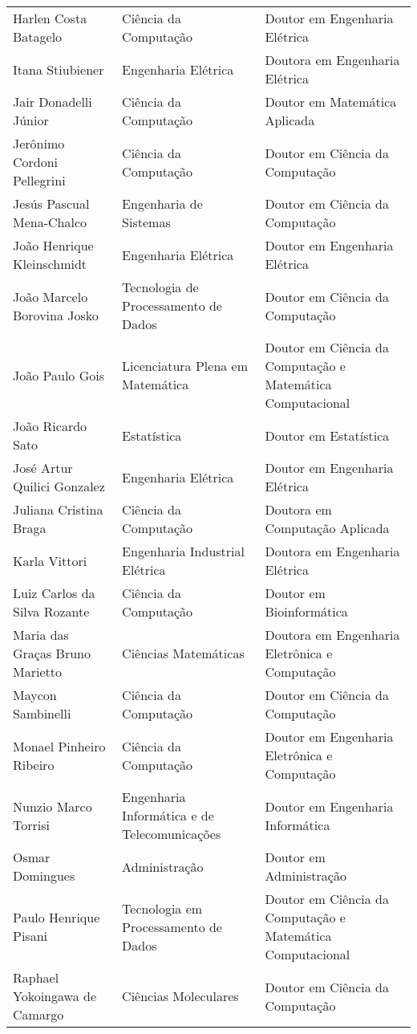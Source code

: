 {\begin{longtable}{|p{}|p{}|p{}|}
    Harlen Costa Batagelo & Ciência da Computação & Doutor em Engenharia Elétrica \\
    Itana Stiubiener & Engenharia Elétrica & Doutora em Engenharia Elétrica \\
    Jair Donadelli Júnior & Ciência da Computação & Doutor em Matemática Aplicada \\
    Jerônimo Cordoni Pellegrini & Ciência da Computação & Doutor em Ciência da Computação \\
    Jesús Pascual Mena-Chalco & Engenharia de Sistemas & Doutor em Ciência da Computação \\
    João Henrique Kleinschmidt & Engenharia Elétrica & Doutor em Engenharia Elétrica \\
    João Marcelo Borovina Josko & Tecnologia de Processamento de Dados & Doutor em Ciência da Computação \\
    João Paulo Gois & Licenciatura Plena em Matemática & Doutor em Ciência da Computação e Matemática Computacional \\
    João Ricardo Sato & Estatística & Doutor em Estatística \\
    José Artur Quilici Gonzalez & Engenharia Elétrica & Doutor em Engenharia Elétrica \\
    Juliana Cristina Braga & Ciência da Computação & Doutora em Computação Aplicada \\
    Karla Vittori & Engenharia Industrial Elétrica & Doutora em Engenharia Elétrica \\
    Luiz Carlos da Silva Rozante & Ciência da Computação & Doutor em Bioinformática \\
    Maria das Graças Bruno Marietto & Ciências Matemáticas & Doutora em Engenharia Eletrônica e Computação \\
    Maycon Sambinelli & Ciência da Computação & Doutor em Ciência da Computação \\
    Monael Pinheiro Ribeiro & Ciência da Computação & Doutor em Engenharia Eletrônica e Computação \\
    Nunzio Marco Torrisi & Engenharia Informática e de Telecomunicações & Doutor em Engenharia Informática \\
    Osmar Domingues & Administração & Doutor em Administração \\
    Paulo Henrique Pisani & Tecnologia em Processamento de Dados & Doutor em Ciência da Computação e Matemática Computacional \\
    Raphael Yokoingawa de Camargo & Ciências Moleculares & Doutor em Ciência da Computação \\

\end{longtable}}
